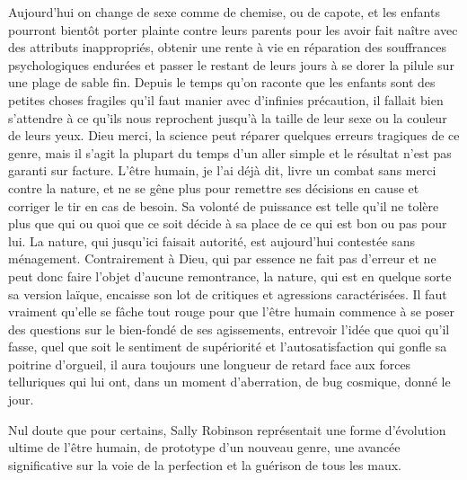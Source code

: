 Aujourd’hui on change de sexe comme de chemise, ou de capote, et les enfants pourront bientôt porter plainte contre leurs parents pour les avoir fait naître avec des attributs inappropriés, obtenir une rente à vie en réparation des souffrances psychologiques endurées et passer le restant de leurs jours à se dorer la pilule sur une plage de sable fin. Depuis le temps qu’on raconte que les enfants sont des petites choses fragiles qu’il faut manier avec d’infinies précaution, il fallait bien s’attendre à ce qu’ils nous reprochent jusqu’à la taille de leur sexe ou la couleur de leurs yeux. Dieu merci, la science peut réparer quelques erreurs tragiques de ce genre, mais il s’agit la plupart du temps d’un aller simple et le résultat n’est pas garanti sur facture. L’être humain, je l’ai déjà dit, livre un combat sans merci contre la nature, et ne se gêne plus pour remettre ses décisions en cause et corriger le tir en cas de besoin. Sa volonté de puissance est telle qu’il ne tolère plus que qui ou quoi que ce soit décide à sa place de ce qui est bon ou pas pour lui. La nature, qui jusqu’ici faisait autorité, est aujourd’hui contestée sans ménagement. Contrairement à Dieu, qui par essence ne fait pas d’erreur et ne peut donc faire l’objet d’aucune remontrance, la nature, qui est en quelque sorte sa version laïque, encaisse son lot de critiques et agressions caractérisées. Il faut vraiment qu’elle se fâche tout rouge pour que l’être humain commence à se poser des questions sur le bien-fondé de ses agissements, entrevoir l’idée que quoi qu’il fasse, quel que soit le sentiment de supériorité et l’autosatisfaction qui gonfle sa poitrine d’orgueil, il aura toujours une longueur de retard face aux forces telluriques qui lui ont, dans un moment d’aberration, de bug cosmique, donné le jour.

Nul doute que pour certains, Sally Robinson représentait une forme d’évolution ultime de l’être humain, de prototype d’un nouveau genre, une avancée significative sur la voie de la perfection et la guérison de tous les maux.


